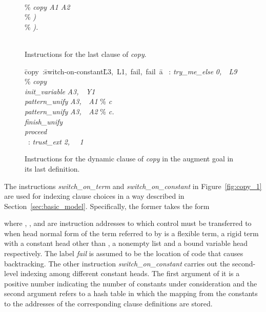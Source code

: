 \begin{figure}
\begin{tabbing}
\>                                      \\
\>                                    \> \%        \>     \>                 \>        \> {\it copy A1 A2}  \\
\>                     \>                        \> \%        \>     \>                 \> {\it )}\\
\>                       \>                        \> \% {\it ).}\\
\>                           \\
\>                  
\end{tabbing}
\caption{Instructions for the last clause of {\it copy}.}\label{fig:copy_2}
\end{figure}

\begin{figure}\footnotesize
\begin{tabbing}
\dquad\=copy\ :\dquad\=switch-on-constant\dquad\=L3,\ L1,\ fail,\ fail\ \dquad\dquad a\= \kill
{}\ : \> {\it try\_me\_else}    \> {\it 0,\ \ L9}   \> \% {\it copy\ }\= \\
\>              \> {\it init\_variable}   \> {\it A3,\ \ Y1}  \\
\>              \> {\it pattern\_unify}   \> {\it A3,\ \ A1}  \> \%             \> {\it c} \\
\>              \> {\it pattern\_unify}   \> {\it A3,\ \ A2}  \> \%             \> {\it c.} \\
\>              \> {\it finish\_unify}    \\
\>              \> {\it proceed}          \\
\ :   \> {\it trust\_ext}       \> {\it 2, \ \ 1}
\end{tabbing}
\caption{Instructions for the dynamic clause of {\it copy} in the augment goal in its last definition.}\label{fig:copy_3}
\end{figure}

The instructions {\it switch\_on\_term} and {\it switch\_on\_constant}
in Figure~\ref{fig:copy_1} are used for indexing clause choices in a way
described in Section~\ref{sec:basic_model}.
Specifically, the former
takes the form
\begin{tabbing}
\end{tabbing}
where , ,  and  are instruction addresses to which control must
be transferred to when head normal form of the term referred to by 
is a flexible term, a rigid term with a constant head other than ,
a nonempty list and a bound variable head respectively. The label {\it fail}
is assumed to be the location of code that causes backtracking.
The other instruction {\it switch\_on\_constant} carries out the second-level
indexing among different constant heads. The first argument of it is a positive
number indicating the number of constants under consideration and the second
argument refers to a hash table in which the mapping from the constants to
the addresses of the corresponding clause definitions are stored.

